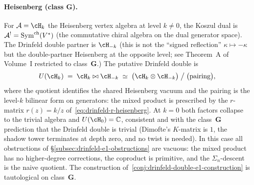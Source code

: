 \paragraph{Heisenberg (class $\mathbf{G}$).}
For $\cA = \cH_k$ the Heisenberg vertex algebra at level
$k\ne 0$, the Koszul dual is $\mathcal{A}^! = \mathrm{Sym}^{\mathrm{ch}}(V^*)$ (the commutative chiral
algebra on the dual generator space). The Drinfeld double partner is $\cH_{-k}$ (this is not the ``signed
reflection'' $\kappa\mapsto-\kappa$ but the
double-partner Heisenberg at the opposite level; see
Theorem~A of Volume~I restricted to class~$\mathbf{G}$.)
The putative Drinfeld double is
\[
U(\cH_k)
\;=\;
\cH_k \bowtie \cH_{-k}
\;\simeq\;
\bigl(\cH_k \otimes \cH_{-k}\bigr) \;\big/\;
\bigl(\text{pairing}\bigr),
\]
where the quotient identifies the shared Heisenberg
vacuum and the pairing is the level-$k$ bilinear form
on generators: the mixed product is prescribed by the
$r$-matrix $r(z) = k/z$ of~\eqref{eq:drinfeld-r-heisenberg}.
At $k = 0$ both factors collapse to the trivial algebra
and $U(\cH_0) = \mathbb{C}$, consistent and
with the class~$\mathbf{G}$ prediction that the Drinfeld
double is trivial (Dimofte's $K$-matrix is $1$, the
shadow tower terminates at depth zero, and no twist is
needed). In this case all obstructions of
\S\ref{subsec:drinfeld-e1-obstructions} are vacuous: the
mixed product has no higher-degree corrections, the
coproduct is primitive, and the $\Sigma_n$-descent is the
naive quotient. The construction
of~\eqref{conj:drinfeld-double-e1-construction} is
tautological on class~$\mathbf{G}$.

